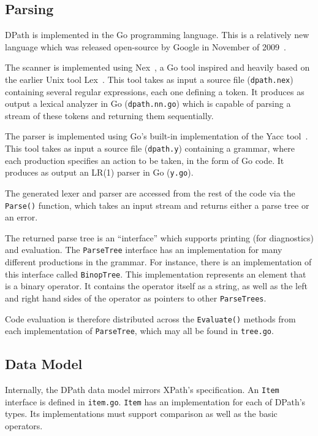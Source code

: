 \documentclass{article}
\begin{document}
\subsection{Parsing}

DPath is implemented in the Go programming language. This is a relatively new
language which was released open-source by Google in November of
2009~\cite{golang}.

The scanner is implemented using Nex~\cite{nex}, a Go tool inspired and heavily
based on the earlier Unix tool Lex~\cite{lex}. This tool takes as input a source
file (\texttt{dpath.nex}) containing several regular expressions, each one
defining a token. It produces as output a lexical analyzer in Go
(\texttt{dpath.nn.go}) which is capable of parsing a stream of these tokens and
returning them sequentially.

The parser is implemented using Go's built-in implementation of the Yacc
tool~\cite{yacc}. This tool takes as input a source file (\texttt{dpath.y})
containing a grammar, where each production specifies an action to be taken, in
the form of Go code. It produces as output an LR(1) parser in Go
(\texttt{y.go}).

The generated lexer and parser are accessed from the rest of the code via the
\texttt{Parse()} function, which takes an input stream and returns either a
parse tree or an error.

The returned parse tree is an ``interface'' which supports printing (for
diagnostics) and evaluation. The \texttt{ParseTree} interface has an
implementation for many different productions in the grammar. For instance,
there is an implementation of this interface called \texttt{BinopTree}. This
implementation represents an element that is a binary operator. It contains the
operator itself as a string, as well as the left and right hand sides of the
operator as pointers to other \texttt{ParseTrees}.

Code evaluation is therefore distributed across the \texttt{Evaluate()} methods
from each implementation of \texttt{ParseTree}, which may all be found in
\texttt{tree.go}.

\subsection{Data Model}

Internally, the DPath data model mirrors XPath's specification. An \texttt{Item}
interface is defined in \texttt{item.go}. \texttt{Item} has an implementation
for each of DPath's types. Its implementations must support comparison as well
as the basic operators.
\end{document}
